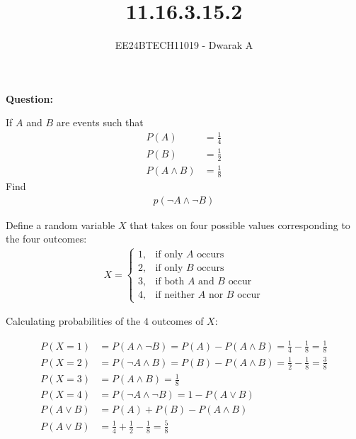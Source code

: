 \documentclass[journal]{IEEEtran}
\begin{document}

\vspace{3cm}

\title{11.16.3.15.2}
\author{EE24BTECH11019 - Dwarak A}
{\let\newpage\relax\maketitle}

\renewcommand{\thefigure}{\theenumi}
\renewcommand{\thetable}{\theenumi}
\setlength{\intextsep}{10pt} %


\renewcommand{\thetable}{\theenumi}

\textbf{Question:}

If $A$ and $B$ are events such that
\begin{align}
    P(A) &= \frac{1}{4} \\
    P(B) &= \frac{1}{2} \\
    P(A \land B) &= \frac{1}{8}
\end{align}
Find
\begin{align}
    p(\neg A \land \neg B)
\end{align}

\solution

Define a random variable $X$ that takes on four possible values corresponding to the four outcomes:
\begin{align}
    X =
    \begin{cases}
        1, & \text{if only } A \text{ occurs} \\
        2, & \text{if only } B \text{ occurs} \\
        3, & \text{if both } A \text{ and } B \text{ occur} \\
        4, & \text{if neither } A \text{ nor } B \text{ occur}
    \end{cases}
\end{align}

Calculating probabilities of the $4$ outcomes of $X$:

\begin{align}
    P(X = 1) &= P(A \land \neg B) = P(A) - P(A \land B) = \frac{1}{4} - \frac{1}{8} = \frac{1}{8} \\
    P(X = 2) &= P(\neg A \land B) = P(B) - P(A \land B) = \frac{1}{2} - \frac{1}{8} = \frac{3}{8} \\
    P(X = 3) &= P(A \land B) = \frac{1}{8} \\
    P(X = 4) &= P(\neg A \land \neg B) = 1 - P(A \lor B) \label{eqn:9}\\
    P(A \lor B) &= P(A) + P(B) - P(A \land B) \\
    P(A \lor B) &= \frac{1}{4} + \frac{1}{2} - \frac{1}{8} = \frac{5}{8} \label{eqn:11}
\end{align}
\end{document}
